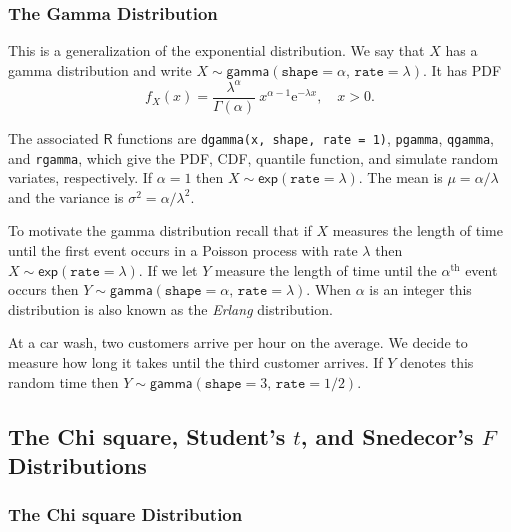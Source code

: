 \documentclass[captions=tableheading]{scrbook}
\begin{document}
\subsubsection{The Gamma Distribution}
\label{sec-1-5-1-2}
\label{sub-The-Gamma-Distribution}


This is a generalization of the exponential distribution. We say that \(X\) has a gamma distribution and write \(X\sim\mathsf{gamma}(\mathtt{shape}=\alpha,\,\mathtt{rate}=\lambda)\). It has PDF
\begin{equation}
f_{X}(x)=\frac{\lambda^{\alpha}}{\Gamma(\alpha)}\: x^{\alpha-1}\mathrm{e}^{-\lambda x},\quad x>0.
\end{equation}

The associated \(\mathsf{R}\) functions are \texttt{dgamma(x, shape, rate = 1)}, \texttt{pgamma}, \texttt{qgamma}, and \texttt{rgamma}, which give the PDF, CDF, quantile function, and simulate random variates, respectively. If \(\alpha=1\) then \(X\sim\mathsf{exp}(\mathtt{rate}=\lambda)\). The mean is \(\mu=\alpha/\lambda\) and the variance is \(\sigma^{2}=\alpha/\lambda^{2}\).

To motivate the gamma distribution recall that if \(X\) measures the length of time until the first event occurs in a Poisson process with rate \(\lambda\) then \(X\sim\mathsf{exp}(\mathtt{rate}=\lambda)\). If we let \(Y\) measure the length of time until the \(\alpha^{\mathrm{th}}\) event occurs then \(Y\sim\mathsf{gamma}(\mathtt{shape}=\alpha,\,\mathtt{rate}=\lambda)\). When \(\alpha\) is an integer this distribution is also known as the \emph{Erlang} distribution.

\begin{example}
At a car wash, two customers arrive per hour on the average. We decide to measure how long it takes until the third customer arrives. If \(Y\) denotes this random time then \(Y\sim\mathsf{gamma}(\mathtt{shape}=3,\,\mathtt{rate}=1/2)\).
\end{example}
\subsection{The Chi square, Student's \(t\), and Snedecor's \(F\) Distributions}
\label{sec-1-5-2}
\label{sub-The-Chi-Square-t-F}
\subsubsection{The Chi square Distribution}
\label{sec-1-5-2-1}
\label{sub-The-Chi-Square}
\end{document}
